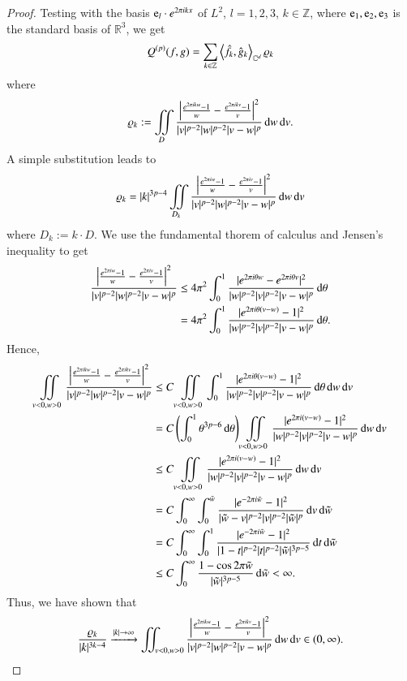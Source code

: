 \begin{proof}
   Testing with the basis ${\rm e}_l \cdot e^{2\pi i k x}$ of $L^2$, $l=1,2,3$, $k\in \mathbb Z$, where ${\rm e}_1, {\rm e}_2, {\rm e}_3$ is the standard basis of $\mathbb R ^3$,
   we get
\begin{equation*}
      Q^{(p)}(f,g) =
       \sum_{k\in\mathbb{Z}} \left\langle\hat f_k,\hat g_k\right\rangle_{\mathbb{C}^d} \varrho_k
 \end{equation*}
 where
 \begin{equation*} 
       \varrho_k :=  
       \iint\limits_{D} 
       \frac{ \left| \frac {e^{2\pi i  kw} -1} {w} - \frac {e^{2\pi i k v} -1} {v} \right|^2}{|v|^{p-2}|w|^{p-2}|v-w|^{p}} \,\mathrm{d} w\,\mathrm{d} v.
  \end{equation*}
 A simple substitution leads to 
 \begin{align*}
  \varrho_k = \left|k\right|^{3p - 4}
  \iint\limits_{D_k} 
       \frac{ \left| \frac {e^{2\pi i  w} -1} {w} - \frac {e^{2\pi i  v} -1} {v}\right|^2}{|v|^{p-2}|w|^{p-2}|v-w|^{p}} \,\mathrm{d} w\,\mathrm{d} v 
 \end{align*}
 where $D_k := k \cdot D.$ We use the fundamental thorem of calculus and Jensen's inequality to get
 \begin{align*}
  \frac{ \left| \frac {e^{2\pi i  w} -1} {w} - \frac {e^{2\pi i  v} -1} {v}\right|^2}{|v|^{p-2}|w|^{p-2}|v-w|^{p}}
  &\leq 4\pi^{2}\int_0^1 \frac {|e^{2\pi i \theta w} - e^{2\pi i \theta v} |^2} {|w|^{p-2} |v|^{p-2} |v-w|^{p}} \,\mathrm{d} \theta\\
  &= 4\pi^{2} \int_0^1 \frac {|e^{2\pi i \theta (v-w)} - 1 |^2} {|w|^{p-2} |v|^{p-2} |v-w|^{p}} \,\mathrm{d} \theta.
 \end{align*}
 Hence, 
 \begin{align*}
  \iint\limits_{v<0, w>0} \frac{ \left| \frac {e^{2\pi i k w} -1} {w} - \frac {e^{2\pi i k v} -1} {v}\right|^2}{|v|^{p-2}|w|^{p-2}|v-w|^{p}}
  &\leq C\iint\limits_{v<0, w>0} \int_0^1 \frac {|e^{2\pi i \theta (v-w)} - 1 |^2} {|w|^{p-2} |v|^{p-2} |v-w|^{p}} \,\mathrm{d} \theta \,\mathrm{d} w \,\mathrm{d} v
  \\ &= C\left( \int_0^1  {\theta^{3p-6}} \,\mathrm{d} \theta \right) \iint\limits_{v<0, w>0}  \frac {|e^{2\pi i  (v-w)} - 1 |^2} {|w|^{p-2} |v|^{p-2} |v-w|^{p}}  \,\mathrm{d} w \,\mathrm{d} v
  \\ &\leq C \iint\limits_{v<0, w>0}  \frac {|e^{2\pi i  (v-w)} - 1 |^2} {|w|^{p-2} |v|^{p-2} |v-w|^{p}}  \,\mathrm{d} w \,\mathrm{d} v
  \\ & = C \int_0^\infty \int_{0}^{\tilde w} \frac {|e^{-2\pi i \tilde w} - 1 |^2} {|\tilde w -v|^{p-2} |v|^{p-2} |\tilde w|^{p}}  \,\mathrm{d} v \,\mathrm{d} \tilde w
  \\ & = C  \int_0^\infty \int_0^1  \frac {|e^{-2\pi i \tilde w} - 1 |^2} {|1 -t|^{p-2} |t|^{p-2} |\tilde w|^{3p-5}}  \,\mathrm{d} t \,\mathrm{d} \tilde w
  \\ & \le C \int_0^\infty \frac {1-\cos2\pi\tilde w} {|\tilde w|^{3p-5}} \,\mathrm{d} \tilde w < \infty.
 \end{align*}
 Thus, we have shown that
 \begin{equation*}
  \frac {\varrho_k} {|k|^{3k-4}} \xrightarrow{|k| \rightarrow \infty} \iint_{v<0, w>0} \frac{ \left| \frac {e^{2\pi i k w} -1} {w} - \frac {e^{2\pi i k v} -1} {v}\right|^2}{|v|^{p-2}|w|^{p-2}|v-w|^{p}}\,\mathrm{d} w\,\mathrm{d} v \in (0, \infty).
 \end{equation*}
\end{proof}

